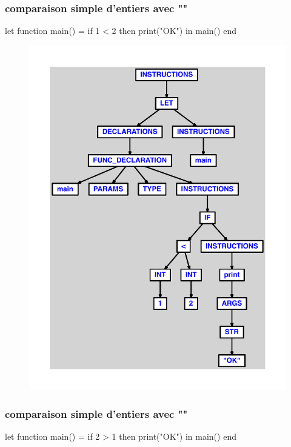 \documentclass{article}
\begin{document}
\subsubsection{comparaison simple d'entiers avec ""}
\begin{verbatimtab}
let
	function main() =
		if 1 < 2 then print("OK")
in main() end
\end{verbatimtab}
\begin{figure}[H]\centering\includegraphics[max width=\textwidth]{ast/ast_167.pdf}\end{figure}\subsubsection{comparaison simple d'entiers avec ""}
\begin{verbatimtab}
let
	function main() =
		if 2 > 1 then print("OK")
in main() end
\end{verbatimtab}
\end{document}
